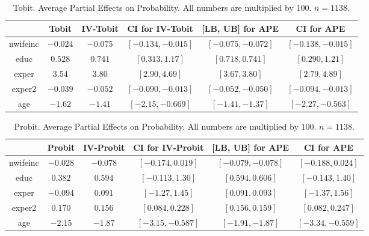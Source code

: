 \documentclass[12pt]{article}
\begin{document}
\begin{table}[!h]
  \begin{center}
  \begin{tabular}{|c|c|cc|cc|}
    \hline\hline
   &  Tobit & IV-Tobit & CI for IV-Tobit & [LB, UB] for APE & CI for APE\\ \hline
    nwifeinc &  $-0.024$ & $-0.075$ & $[-0.134,-0.015]$ & $[-0.075,-0.072]$ & $[-0.138,-0.015]$\\ 
    educ &  $0.528$ & $0.741$ & $[0.313,1.17]$ & $[0.718,0.741]$ & $[0.290,1.21]$\\ 
    exper &  $3.54$ & $3.80$ & $[2.90,4.69]$ & $[3.67,3.80]$ & $[2.79,4.89]$\\ 
    exper2 &  $-0.039$ & $-0.052$ & $[-0.090,-0.013]$ & $[-0.052,-0.050]$ & $[-0.094,-0.013]$\\ 
    age &  $-1.62$ & $-1.41$ & $[-2.15,-0.669]$ & $[-1.41,-1.37]$ & $[-2.27,-0.563]$\\ 
  \hline\hline
  \end{tabular}
  \caption{Tobit. Average Partial Effects on Probability. All numbers are multiplied by 100. $n=1138$.}
  \label{table:Emp-Tobit-PEM-P-w-CI}
  \end{center}
\end{table}

\begin{table}[!h]
  \begin{center}
  \begin{tabular}{|c|c|cc|cc|}
    \hline\hline
   &  Probit & IV-Probit & CI for IV-Probit & [LB, UB] for APE & CI for APE\\ \hline
    nwifeinc &  $-0.028$ & $-0.078$ & $[-0.174,0.019]$ & $[-0.079,-0.078]$ & $[-0.188,0.024]$\\ 
    educ &  $0.382$ & $0.594$ & $[-0.113,1.30]$ & $[0.594,0.606]$ & $[-0.143,1.40]$\\ 
    exper &  $-0.094$ & $0.091$ & $[-1.27,1.45]$ & $[0.091,0.093]$ & $[-1.37,1.56]$\\ 
    exper2 &  $0.170$ & $0.156$ & $[0.084,0.228]$ & $[0.156,0.159]$ & $[0.082,0.247]$\\ 
    age &  $-2.15$ & $-1.87$ & $[-3.15,-0.587]$ & $[-1.91,-1.87]$ & $[-3.34,-0.559]$\\ 
  \hline\hline
  \end{tabular}
  \caption{Probit. Average Partial Effects on Probability. All numbers are multiplied by 100. $n=1138$.}
  \label{table:Emp-Probit-PEM-P-w-CI}
  \end{center}
\end{table}
\end{document}
